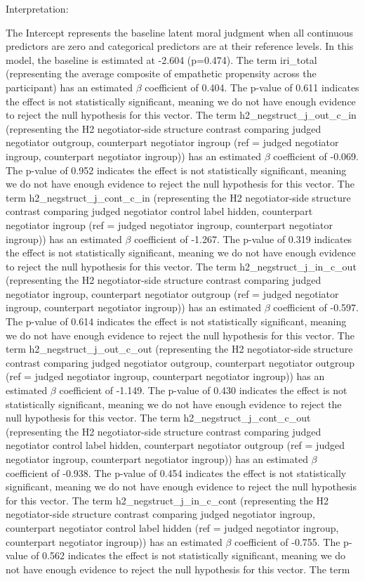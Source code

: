 \documentclass[11pt]{article}
\begin{document}
Interpretation:

The Intercept represents the baseline latent moral judgment when all continuous predictors are zero and categorical predictors are at their reference levels. In this model, the baseline is estimated at -2.604 (p=0.474). The term iri\_total (representing the average composite of empathetic propensity across the participant) has an estimated $\beta$ coefficient of 0.404. The p-value of 0.611 indicates the effect is not statistically significant, meaning we do not have enough evidence to reject the null hypothesis for this vector. The term h2\_negstruct\_j\_out\_c\_in (representing the H2 negotiator-side structure contrast comparing judged negotiator outgroup, counterpart negotiator ingroup (ref = judged negotiator ingroup, counterpart negotiator ingroup)) has an estimated $\beta$ coefficient of -0.069. The p-value of 0.952 indicates the effect is not statistically significant, meaning we do not have enough evidence to reject the null hypothesis for this vector. The term h2\_negstruct\_j\_cont\_c\_in (representing the H2 negotiator-side structure contrast comparing judged negotiator control label hidden, counterpart negotiator ingroup (ref = judged negotiator ingroup, counterpart negotiator ingroup)) has an estimated $\beta$ coefficient of -1.267. The p-value of 0.319 indicates the effect is not statistically significant, meaning we do not have enough evidence to reject the null hypothesis for this vector. The term h2\_negstruct\_j\_in\_c\_out (representing the H2 negotiator-side structure contrast comparing judged negotiator ingroup, counterpart negotiator outgroup (ref = judged negotiator ingroup, counterpart negotiator ingroup)) has an estimated $\beta$ coefficient of -0.597. The p-value of 0.614 indicates the effect is not statistically significant, meaning we do not have enough evidence to reject the null hypothesis for this vector. The term h2\_negstruct\_j\_out\_c\_out (representing the H2 negotiator-side structure contrast comparing judged negotiator outgroup, counterpart negotiator outgroup (ref = judged negotiator ingroup, counterpart negotiator ingroup)) has an estimated $\beta$ coefficient of -1.149. The p-value of 0.430 indicates the effect is not statistically significant, meaning we do not have enough evidence to reject the null hypothesis for this vector. The term h2\_negstruct\_j\_cont\_c\_out (representing the H2 negotiator-side structure contrast comparing judged negotiator control label hidden, counterpart negotiator outgroup (ref = judged negotiator ingroup, counterpart negotiator ingroup)) has an estimated $\beta$ coefficient of -0.938. The p-value of 0.454 indicates the effect is not statistically significant, meaning we do not have enough evidence to reject the null hypothesis for this vector. The term h2\_negstruct\_j\_in\_c\_cont (representing the H2 negotiator-side structure contrast comparing judged negotiator ingroup, counterpart negotiator control label hidden (ref = judged negotiator ingroup, counterpart negotiator ingroup)) has an estimated $\beta$ coefficient of -0.755. The p-value of 0.562 indicates the effect is not statistically significant, meaning we do not have enough evidence to reject the null hypothesis for this vector. The term 
\end{document}
